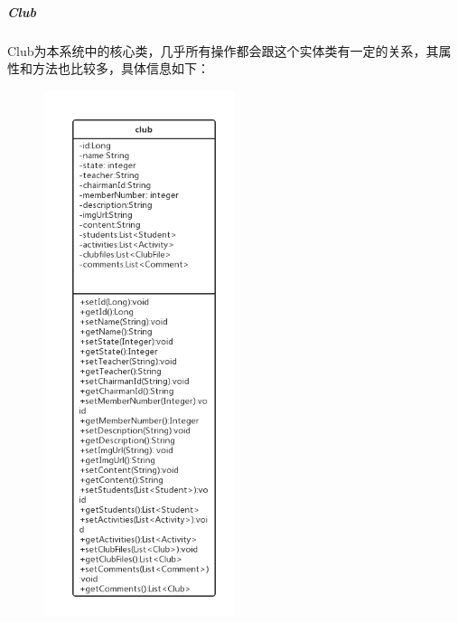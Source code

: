 \documentclass[UTF8]{ctexart}
\begin{document}
\subparagraph{Club}
Club为本系统中的核心类，几乎所有操作都会跟这个实体类有一定的关系，其属性和方法也比较多，具体信息如下：
\newline
\begin{figure}[H]
\centering
\includegraphics[width = 0.5\textwidth]{club-class.png}
\end{figure}
\end{document}
